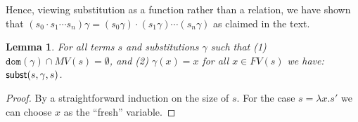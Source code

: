 \documentclass{lmcs}
\theoremstyle{theorem}\newtheorem{theorem}{Theorem}
\theoremstyle{theorem}\newtheorem{lemma}[theorem]{Lemma}
\theoremstyle{theorem}\newtheorem{corollary}[theorem]{Corollary}
\theoremstyle{definition}\newtheorem{definition}[theorem]{Definition}
\theoremstyle{definition}\newtheorem{example}[theorem]{Example}
\newcommand{\FV}{\mathit{FV}}
\newcommand{\FMV}{\mathit{MV}}
\newcommand{\domain}{\mathtt{dom}}
\newcommand{\identifier}[1]{\mathtt{#1}}
\newcommand{\afun}{\identifier{f}}
\newcommand{\avar}{x}
\newcommand{\bvar}{y}
\newcommand{\Avar}{X}
\newcommand{\abs}[2]{\lambda #1.#2}
\newcommand{\meta}[2]{#1\langle#2\rangle}
\newcommand{\tuple}[2]{\llparenthesis #1,\dots,#2 \rrparenthesis}
\begin{document}
Hence, viewing substitution as a function rather than a relation, we have shown
that $(s_0 \cdot s_1 \cdots s_n)\gamma = (s_0\gamma) \cdot (s_1\gamma) \cdots
(s_n\gamma)$ as claimed in the text.

\begin{lemma}\label{lem:substitutionrefl}
For all terms $s$ and substitutions $\gamma$ such that (1) $\domain(\gamma) \cap
\FMV(s) = \emptyset$, and (2) $\gamma(x) = x$ for all $x \in \FV(s)$ we have:
$\mathsf{subst}(s,\gamma,s)$.
\end{lemma}

\begin{proof}
By a straightforward induction on the size of $s$.  For the case $s =
\abs{x}{s'}$ we can choose $x$ as the ``fresh'' variable.
\end{proof}
\end{document}
